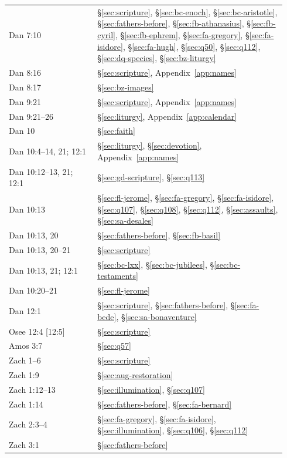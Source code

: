 \begin{longtable}{>{\raggedright\arraybackslash}p{0.30\linewidth}>{\raggedright\arraybackslash}p{0.64\linewidth}}
Dan 7:10 & \S\ref{sec:scripture}, \S\ref{sec:bc-enoch}, \S\ref{sec:bc-aristotle}, \S\ref{sec:fathers-before}, \S\ref{sec:fb-athanasius}, \S\ref{sec:fb-cyril}, \S\ref{sec:fb-ephrem}, \S\ref{sec:fa-gregory}, \S\ref{sec:fa-isidore}, \S\ref{sec:fa-hugh}, \S\ref{sec:q50}, \S\ref{sec:q112}, \S\ref{sec:dq-species}, \S\ref{sec:bz-liturgy}\\
Dan 8:16 & \S\ref{sec:scripture}, Appendix~\ref{app:names}\\
Dan 8:17 & \S\ref{sec:bz-images}\\
Dan 9:21 & \S\ref{sec:scripture}, Appendix~\ref{app:names}\\
Dan 9:21--26 & \S\ref{sec:liturgy}, Appendix~\ref{app:calendar}\\
Dan 10 & \S\ref{sec:faith}\\
Dan 10:4--14, 21; 12:1 & \S\ref{sec:liturgy}, \S\ref{sec:devotion}, Appendix~\ref{app:names}\\
Dan 10:12--13, 21; 12:1 & \S\ref{sec:gd-scripture}, \S\ref{sec:q113}\\
Dan 10:13 & \S\ref{sec:fl-jerome}, \S\ref{sec:fa-gregory}, \S\ref{sec:fa-isidore}, \S\ref{sec:q107}, \S\ref{sec:q108}, \S\ref{sec:q112}, \S\ref{sec:assaults}, \S\ref{sec:sa-desales}\\
Dan 10:13, 20 & \S\ref{sec:fathers-before}, \S\ref{sec:fb-basil}\\
Dan 10:13, 20--21 & \S\ref{sec:scripture}\\
Dan 10:13, 21; 12:1 & \S\ref{sec:bc-lxx}, \S\ref{sec:bc-jubilees}, \S\ref{sec:bc-testaments}\\
Dan 10:20--21 & \S\ref{sec:fl-jerome}\\
Dan 12:1 & \S\ref{sec:scripture}, \S\ref{sec:fathers-before}, \S\ref{sec:fa-bede}, \S\ref{sec:sa-bonaventure}\\
Osee 12:4 [12:5] & \S\ref{sec:scripture}\\
Amos 3:7 & \S\ref{sec:q57}\\
Zach 1--6 & \S\ref{sec:scripture}\\
Zach 1:9 & \S\ref{sec:aug-restoration}\\
Zach 1:12--13 & \S\ref{sec:illumination}, \S\ref{sec:q107}\\
Zach 1:14 & \S\ref{sec:fathers-before}, \S\ref{sec:fa-bernard}\\
Zach 2:3--4 & \S\ref{sec:fa-gregory}, \S\ref{sec:fa-isidore}, \S\ref{sec:illumination}, \S\ref{sec:q106}, \S\ref{sec:q112}\\
Zach 3:1 & \S\ref{sec:fathers-before}\\

\end{longtable}
